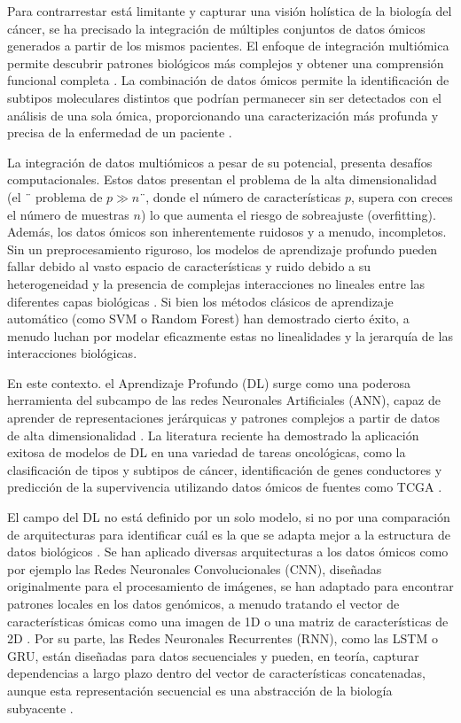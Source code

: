 \documentclass[review,12pt,times,number]{elsarticle}
\begin{document}
Para contrarrestar está limitante y capturar una visión holística de la biología del cáncer, se ha precisado la integración de múltiples conjuntos de datos ómicos generados a partir de los mismos pacientes. El enfoque de integración multiómica permite descubrir patrones biológicos más complejos y obtener una comprensión funcional completa \cite{hernandez2024methods}. La combinación de datos ómicos permite la identificación de subtipos moleculares distintos que podrían permanecer sin ser detectados con el análisis de una sola ómica, proporcionando una caracterización más profunda y precisa de la enfermedad de un paciente \cite{kutlay2021integrative}.

La integración de datos multiómicos a pesar de su potencial, presenta desafíos computacionales. Estos datos presentan el problema de la alta dimensionalidad (el ¨ problema de $p \gg n$¨, donde el número de características $p$, supera con creces el número de muestras $n$) lo que aumenta el riesgo de sobreajuste (overfitting). Además, los datos ómicos son inherentemente ruidosos y a menudo, incompletos. Sin un preprocesamiento riguroso, los modelos de aprendizaje profundo pueden fallar debido al vasto espacio de características y ruido debido a su heterogeneidad y la presencia de complejas interacciones no lineales entre las diferentes capas biológicas \cite{libbrecht2015machine}. Si bien los métodos clásicos de aprendizaje automático (como SVM o Random Forest) han demostrado cierto éxito, a menudo luchan por modelar eficazmente estas no linealidades y la jerarquía de las interacciones biológicas.

En este contexto. el Aprendizaje Profundo (DL) surge como una poderosa herramienta del subcampo de las redes Neuronales Artificiales (ANN), capaz de aprender de representaciones jerárquicas y patrones complejos a partir de datos de alta dimensionalidad \cite{lecun2015deep}. La literatura reciente ha demostrado la aplicación exitosa de modelos de DL en una variedad de tareas oncológicas, como la clasificación de tipos y subtipos de cáncer, identificación de genes conductores y predicción de la supervivencia utilizando datos ómicos de fuentes como TCGA \cite{sartori2025comprehensive}. 

El campo del DL no está definido por un solo modelo, si no por una comparación de arquitecturas para identificar cuál es la que se adapta mejor a la estructura de datos biológicos \cite{sartori2025comprehensive}. Se han aplicado diversas arquitecturas a los datos ómicos como por ejemplo las Redes Neuronales Convolucionales (CNN), diseñadas originalmente para el procesamiento de imágenes, se han adaptado para encontrar patrones locales en los datos genómicos, a menudo tratando el vector de características ómicas como una imagen de 1D o una matriz de características de 2D \cite{ye2021genomic,chuang2021convolutional}. Por su parte, las Redes Neuronales Recurrentes (RNN), como las LSTM o GRU, están diseñadas para datos secuenciales y pueden, en teoría, capturar dependencias a largo plazo dentro del vector de características concatenadas, aunque esta representación secuencial es una abstracción de la biología subyacente \cite{parthasarathy2025novel,barbadilla2025predicting}.
\end{document}
